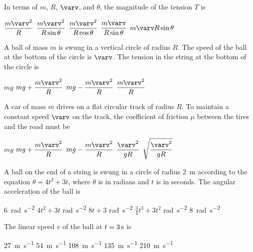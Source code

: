 \documentclass{../../../oss-classkick-exam}
\begin{document}
\begin{multicols*}{2}
\begin{questions}
    \question In terms of $m$, $R$, $\varv$, and $\theta$, the magnitude of the
    tension $T$ is
    \begin{choices}
      \choice $\dfrac{m\varv^2}R$
      \choice $\dfrac{m\varv^2}{R\sin\theta}$
      \choice $\dfrac{m\varv^2}{R\cos\theta}$
      \choice $\dfrac{m\varv}{R\sin\theta}$
      \choice $m\varv R\sin\theta$
    \end{choices}
    \label{ball2}
    \columnbreak
    
  \question A ball of mass $m$ is swung in a vertical circle of radius $R$. The
    speed of the ball at the bottom of the circle is $\varv$. The tension in the
    string at the bottom of the circle is
    \begin{choices}
      \choice $mg$
      \choice $mg+\dfrac{m\varv^2}{R}$
      \choice $mg-\dfrac{m\varv^2}{R}$
      \choice $\dfrac{m\varv^2}{R}$
    \end{choices}
    
  \question A car of mass $m$ drives on a flat circular track of radius $R$. To
    maintain a constant speed $\varv$ on the track, the coefficient of friction
    $\mu$ between the tires and the road must be
    \begin{choices}
      \choice $mg$
      \choice $mg+\dfrac{m\varv^2}{R}$
      \choice $mg-\dfrac{m\varv^2}{R}$
      \choice $\dfrac{\varv^2}{gR}$
      \choice $\sqrt{\dfrac{\varv^2}{gR}}$
    \end{choices}


  \question A ball on the end of a string is swung in a circle of radius
    \SI{2}{\metre} according to the equation $\theta = 4t^2+3t$, where $\theta$
    is in radians and $t$ is in seconds. The angular acceleration of the ball
    is
    \begin{choices}
      \choice\SI{6}{rad\per\second\squared}
      \choice $4t^2 + 3t$ \si{rad\per\second\squared}
      \choice $8t +3$ \si{rad\per\second\squared}
      \choice $\displaystyle\frac{3}{4} t^3 + 3t^2$ \si{rad\per\second\squared}
      \choice \SI{8}{rad\per\second\squared}
    \end{choices}
    \label{rad1}
    
  \question The linear speed $v$ of the ball at $t=\SI3\second$ is
    \begin{choices}
      \choice \SI{27 }{\metre\per\second}
      \choice \SI{54 }{\metre\per\second}
      \choice \SI{108}{\metre\per\second}
      \choice \SI{135}{\metre\per\second}
      \choice \SI{210}{\metre\per\second}
    \end{choices}
    \label{rad2}
    

\end{questions}
\end{multicols*}
\end{document}
